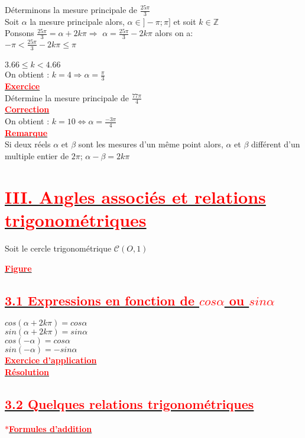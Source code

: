 \documentclass[12pt]{article}
\begin{document}
Déterminons la mesure principale de $\frac{25\pi}{3}$\\
Soit $\alpha$ la mesure principale alors, $\alpha \in ]-\pi ; \pi]$ et soit $k\in\mathbb{Z}$\\
Ponsons $\frac{25\pi}{3}=\alpha+2k\pi \Longrightarrow $ $\alpha=\frac{25\pi}{3}-2k\pi$ alors on a:\\
$-\pi<\frac{25\pi}{3}-2k\pi\leq \pi$\\
\\
$3.66 \leq k < 4.66$\\
On obtient : $k=4 \Longrightarrow \alpha = \frac{\pi}{3}$\\
\underline{\textbf{\textcolor{red}{Exercice}}}\\
Détermine la mesure principale de $\frac{77\pi}{4}$\\
\underline{\textbf{\textcolor{red}{Correction}}}\\
On obtient : $k=10 \Longleftrightarrow \alpha=\frac{-3\pi}{4}$\\
\underline{\textbf{\textcolor{red}{Remarque}}}\\ 
Si deux réels $\alpha$ et $\beta$ sont les mesures d'un même point alors, $\alpha$ et $\beta$ différent d'un multiple entier de $2\pi$; $\alpha-\beta = 2k\pi$
\section*{\underline{\textbf{\textcolor{red}{III. Angles associés et relations trigonométriques}}}}
Soit le cercle trigonométrique $\mathcal{C}(O,1)$\\
\begin{center}
\underline{\textbf{\textcolor{red}{Figure}}}\\
\end{center}
\subsection*{\underline{\textbf{\textcolor{red}{3.1 Expressions en fonction de $cos\alpha$ ou $sin\alpha$}}}}
$cos(\alpha+2k\pi)=cos\alpha$\\
$sin(\alpha+2k\pi)=sin\alpha$\\
$cos(-\alpha)=cos\alpha$\\
$sin(-\alpha)=-sin\alpha$\\

\underline{\textbf{\textcolor{red}{Exercice d'application }}}\\
\underline{\textbf{\textcolor{red}{Résolution }}}
\subsection*{\underline{\textbf{\textcolor{red}{3.2 Quelques relations trigonométriques}}}}
\underline{\textbf{\textcolor{red}{$\ast$Formules d'addition}}}\\
\end{document}
